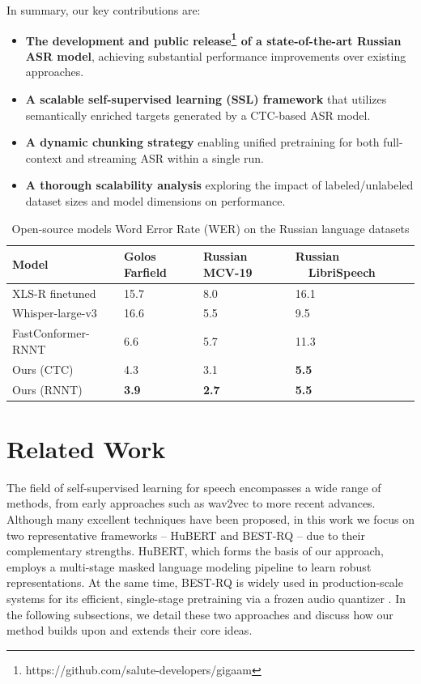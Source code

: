 \documentclass{Interspeech}
\begin{document}
In summary, our key contributions are:

\begin{itemize}
    \item \textbf{The development and public release\footnote{https://github.com/salute-developers/gigaam} of a state-of-the-art Russian ASR model}, achieving substantial performance improvements over existing approaches.

    \item \textbf{A scalable self-supervised learning (SSL) framework} that utilizes semantically enriched targets generated by a CTC-based ASR model.

    \item \textbf{A dynamic chunking strategy} enabling unified pretraining for both full-context and streaming ASR within a single run.

    \item \textbf{A thorough scalability analysis} exploring the impact of labeled/unlabeled dataset sizes and model dimensions on performance.
\end{itemize}

\begin{table}[]
    \centering
    \caption{Open-source models Word Error Rate (WER) on the Russian language datasets}
    \begin{tabular}{p{2.9cm} p{1.1cm} p{1.2cm} p{1.7cm}} %
    \toprule
    \textbf{Model} & \textbf{Golos Farfield} & \textbf{Russian MCV-19}  & \textbf{Russian \ \ LibriSpeech} \\
    \midrule
    XLS-R \cite{xlsr} finetuned  & 15.7 & 8.0 & 16.1 \\
    Whisper-large-v3 & 16.6 & 5.5 & 9.5 \\
    FastConformer-RNNT & 6.6 & 5.7 & 11.3 \\
    Ours (CTC) & 4.3 & 3.1 & \textbf{5.5} \\
    Ours (RNNT) & \textbf{3.9} & \textbf{2.7} & \textbf{5.5} \\
    \bottomrule
    \end{tabular}
    \label{tab:main}
\end{table}

\section{Related Work}

The field of self-supervised learning for speech encompasses a wide range of methods, from early approaches such as wav2vec \cite{wav2vec} to more recent advances. Although many excellent techniques have been proposed, in this work we focus on two representative frameworks -- HuBERT \cite{hubert} and BEST-RQ -- due to their complementary strengths. HuBERT, which forms the basis of our approach, employs a multi-stage masked language modeling pipeline to learn robust representations. At the same time, BEST-RQ is widely used in production-scale systems for its efficient, single-stage pretraining via a frozen audio quantizer \cite{usm}. In the following subsections, we detail these two approaches and discuss how our method builds upon and extends their core ideas.
\end{document}
